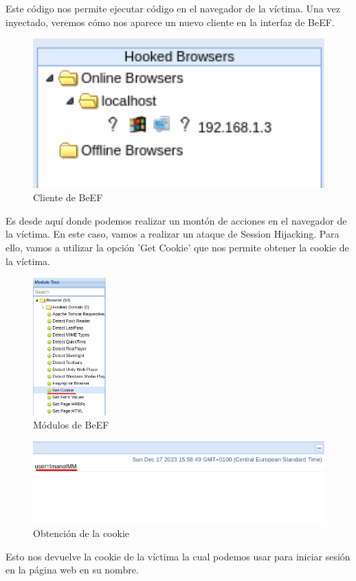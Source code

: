 \documentclass{report}
\begin{document}
                Este código nos permite ejecutar código en el navegador de la víctima.
                Una vez inyectado, veremos cómo nos aparece un nuevo cliente en la interfaz de BeEF.
                \begin{figure}[H]
                    \centering
                    \includegraphics[width=1\textwidth]{./img/vulnerabilidades/2.2/3.3.png}
                    \caption{Cliente de BeEF}
                \end{figure}
                Es desde aquí donde podemos realizar un montón de acciones en el navegador de la víctima.
                En este caso, vamos a realizar un ataque de Session Hijacking.
                Para ello, vamos a utilizar la opción 'Get Cookie' que nos permite obtener la cookie de la víctima.
                \begin{figure}[H]
                    \centering
                    \includegraphics[width=0.25\textwidth]{./img/vulnerabilidades/2.2/3.4.png}
                    \caption{Módulos de BeEF}
                \end{figure}
                \begin{figure}[H]
                    \centering
                    \includegraphics[width=1\textwidth]{./img/vulnerabilidades/2.2/3.5.png}
                    \caption{Obtención de la cookie}
                \end{figure}
                Esto nos devuelve la cookie de la víctima la cual podemos usar para iniciar sesión en la página web en su nombre.\\
\end{document}
